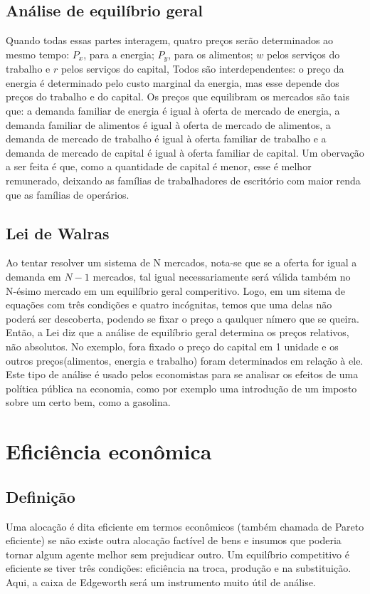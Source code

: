 \documentclass[oneside,12pt, letterpaper]{book}
\begin{document}
{{{\section{An{\'a}lise de equil{\'i}brio geral}
Quando todas essas partes interagem, quatro pre{\c c}os ser{\~a}o determinados ao mesmo tempo: $P_x$, para a energia; $P_y$, para os alimentos; $w$ pelos servi{\c c}os do 
trabalho e $r$ pelos servi{\c c}os do capital, Todos s{\~a}o interdependentes: o pre{\c c}o da energia {\'e} determinado pelo custo marginal da energia, mas esse depende dos 
pre{\c c}os do trabalho e do capital. Os pre{\c c}os que equilibram os mercados s{\~a}o tais que: a demanda familiar de energia {\'e} igual {\`a} oferta de mercado de energia, 
a demanda familiar de alimentos {\'e} igual {\`a} oferta de mercado de alimentos, a demanda de mercado de trabalho {\'e} igual {\`a} oferta familiar de trabalho e a demanda de mercado
de capital {\'e} igual {\`a} oferta familiar de capital. Um oberva{\c c}{\~a}o a ser feita {\'e} que, como a quantidade de capital {\'e} menor, esse {\'e} melhor remunerado, deixando as 
fam{\'i}lias de trabalhadores de escrit{\'o}rio com maior renda que as fam{\'i}lias de oper{\'a}rios. 
\section{Lei de Walras}
Ao tentar resolver um sistema de N mercados, nota-se que se a oferta for igual a demanda em $N-1$ mercados, tal igual necessariamente ser{\'a} v{\'a}lida tamb{\'e}m 
no N-{\'e}simo mercado em um equil{\'i}brio geral comperitivo. Logo, em um sitema de equa{\c c}{\~o}es com tr{\^e}s condi{\c c}{\~o}es e quatro inc{\'o}gnitas, temos que uma delas n{\~a}o poder{\'a} ser 
descoberta, podendo se fixar o pre{\c c}o a qaulquer n{\'i}mero que se queira. Ent{\~a}o, a Lei diz que a an{\'a}lise de equil{\'i}brio geral determina os pre{\c c}os relativos, n{\~a}o
absolutos. No exemplo, fora fixado o pre{\c c}o do capital em 1 unidade e os outros pre{\c c}os(alimentos, energia e trabalho) foram determinados em rela{\c c}{\~a}o {\`a} ele. 
Este tipo de an{\'a}lise {\'e} usado pelos economistas para se analisar os efeitos de uma pol{\'i}tica p{\'u}blica na economia, como por exemplo uma introdu{\c c}{\~a}o de um imposto sobre
um certo bem, como a gasolina.

\chapter{Efici{\^e}ncia econ{\^o}mica}
\section{Defini{\c c}{\~a}o}
Uma aloca{\c c}{\~a}o {\'e} dita eficiente em termos econ{\^o}micos (tamb{\'e}m chamada de Pareto eficiente) se n{\~a}o existe outra aloca{\c c}{\~a}o fact{\'i}vel de bens e insumos que poderia tornar
algum agente melhor sem prejudicar outro. Um equil{\'i}brio competitivo {\'e} eficiente se tiver tr{\^e}s condi{\c c}{\~o}es: efici{\^e}ncia na troca, produ{\c c}{\~a}o e na substitui{\c c}{\~a}o. Aqui, a caixa 
de Edgeworth ser{\'a} um instrumento muito {\'u}til de an{\'a}lise.
}}}
\end{document}
